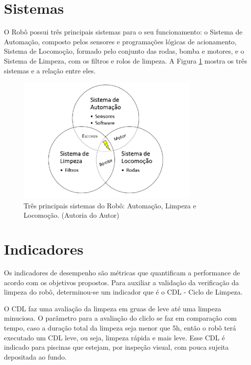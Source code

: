 \section{Sistemas}
O Robô possui três principais sistemas para o seu funcionamento: o Sistema de Automação, composto pelos sensores e programações lógicas de acionamento, Sistema de Locomoção, formado pelo conjunto das rodas, bomba e motores, e o Sistema de Limpeza, com os filtros e rolos de limpeza. A Figura \ref{fig:main-system-project} mostra os três sistemas e a relação entre eles.
\par
  \begin{figure}[h]
    \centering
    \includegraphics[width=0.8\textwidth]{figures/main-system-project.png}
    \caption{Três principais sistemas do Robô: Automação, Limpeza e Locomoção. (\textsf{Autoria do Autor})}
    \label{fig:main-system-project}
  \end{figure}
  \FloatBarrier
\par

\section{Indicadores}
Os indicadores de desempenho são métricas que quantificam a performance de acordo com os objetivos propostos. Para auxiliar a validação da verificação da limpeza do robô, determinou-se um indicador que é o \textsf{CDL} - Ciclo de Limpeza.

O \textsf{CDL} faz uma avaliação da limpeza em gruas de leve até uma limpeza minuciosa. O parâmetro para a avaliação do cliclo se faz em comparação com tempo, caso a duração total da limpeza seja menor que 5h, então o robô terá executado um \textsf{CDL} leve, ou seja, limpeza rápida e mais leve. Esse \textsf{CDL} é indicado para piscinas que estejam, por inspeção visual, com pouca sujeita depositada ao fundo.

